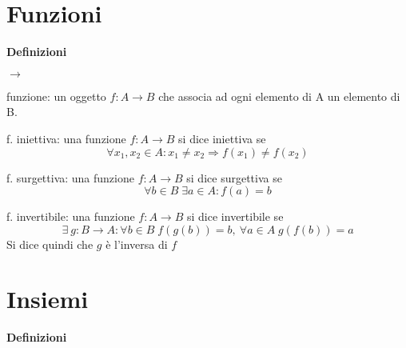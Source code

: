 \documentclass[12pt,a4paper]{article}
\newcommand*{\fun}{$f: A \to B $}
\begin{document}
\section*{Funzioni}
\textbf{Definizioni}

\begin{list}{$\rightarrow$}{}
    \item funzione: un oggetto \fun{} che associa ad ogni elemento di A un elemento di B. 
    \item f. iniettiva: una funzione \fun{} si dice iniettiva se 
    \[\forall x_1, x_2 \in A : x_1 \neq x_2 \Rightarrow f(x_1) \neq f(x_2)\]
    \item f. surgettiva: una funzione \fun{} si dice surgettiva se \[\forall b \in B\; \exists a \in A : f(a) = b \]
    \item f. invertibile: una funzione \fun{} si dice invertibile se \[ \exists \: g: B \to A  : \forall b \in B \; f(g(b)) = b, \: \forall a \in A \; g(f(b)) = a \] Si dice quindi che $g$ è l'inversa di $f$
\end{list}

\section*{Insiemi}
\textbf{Definizioni}
\end{document}
